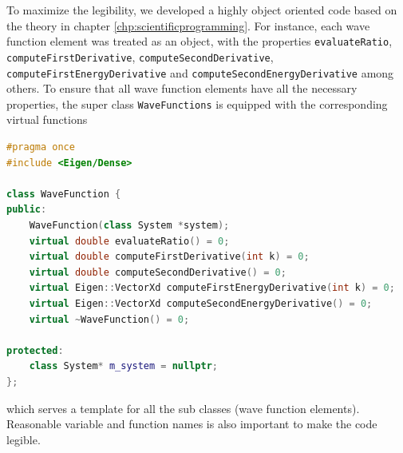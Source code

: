 To maximize the legibility, we developed a highly object oriented code based on the theory in chapter \eqref{chp:scientificprogramming}. For instance, each wave function element was treated as an object, with the properties \texttt{evaluateRatio}, \texttt{computeFirstDerivative}, \texttt{computeSecondDerivative}, \texttt{computeFirstEnergyDerivative} and \texttt{computeSecondEnergyDerivative} among others. To ensure that all wave function elements have all the necessary properties, the super class \texttt{WaveFunctions} is equipped with the corresponding virtual functions
\lstset{basicstyle=\scriptsize}
\begin{lstlisting}[language=c++,caption={Simplification of \texttt{wavefunction.h}}]
#pragma once
#include <Eigen/Dense>

class WaveFunction {
public:
	WaveFunction(class System *system);
	virtual double evaluateRatio() = 0;
	virtual double computeFirstDerivative(int k) = 0;
	virtual double computeSecondDerivative() = 0;
	virtual Eigen::VectorXd computeFirstEnergyDerivative(int k) = 0;
	virtual Eigen::VectorXd computeSecondEnergyDerivative() = 0;
	virtual ~WaveFunction() = 0;

protected:
	class System* m_system = nullptr;
};
\end{lstlisting}
which serves a template for all the sub classes (wave function elements). Reasonable variable and function names is also important to make the code legible. 

